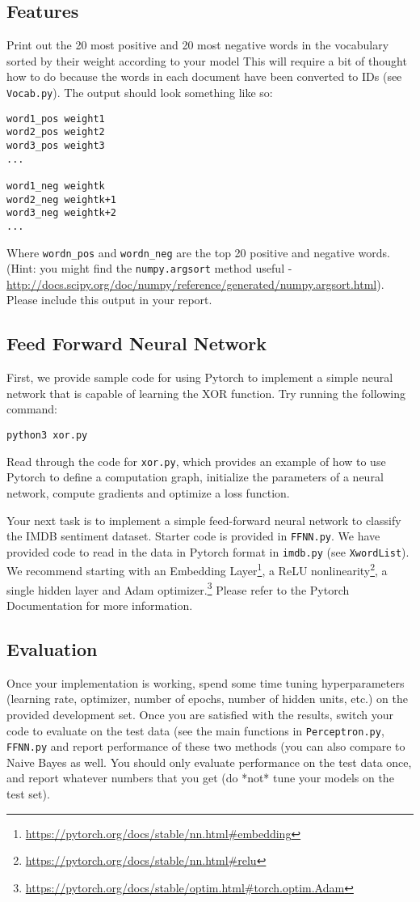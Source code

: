 \documentclass[12pt, letterpaper]{article}
\begin{document}
\subsection*{Features}
Print out the 20 most positive and 20 most negative words in
the vocabulary sorted by their weight according to your model
This will require a bit of thought how to do because the words in each document 
have been converted to IDs (see {\tt Vocab.py}).  The output should look something like so:
\begin{verbatim}
word1_pos weight1
word2_pos weight2
word3_pos weight3
...

word1_neg weightk
word2_neg weightk+1
word3_neg weightk+2
...
\end{verbatim}
Where {\tt wordn\_pos} and {\tt wordn\_neg} are the top 20 positive and negative words.  (Hint: you might find the {\tt numpy.argsort} method
useful - \url{http://docs.scipy.org/doc/numpy/reference/generated/numpy.argsort.html}).  Please include this output in your report.

\subsection*{Feed Forward Neural Network}
First, we provide sample code for using Pytorch to implement a simple neural network that is capable of learning the XOR function.  Try running the following command:
\begin{verbatim}
python3 xor.py
\end{verbatim}
Read through the code for {\tt xor.py}, which provides an example of how to use Pytorch to define a computation graph, initialize the parameters of a neural network, compute gradients and optimize a loss function.

Your next task is to implement a simple feed-forward neural network to classify the IMDB sentiment dataset.  Starter code is provided in {\tt FFNN.py}.  We have provided code to read in the data in Pytorch format in {\tt imdb.py} (see {\tt XwordList}).
We recommend starting with an Embedding Layer\footnote{\url{https://pytorch.org/docs/stable/nn.html\#embedding}}, a ReLU nonlinearity\footnote{\url{https://pytorch.org/docs/stable/nn.html\#relu}}, a single hidden layer and Adam optimizer.\footnote{\url{https://pytorch.org/docs/stable/optim.html\#torch.optim.Adam}}
Please refer to the Pytorch Documentation for more information.

\subsection*{Evaluation}
Once your implementation is working, spend some time tuning hyperparameters (learning rate, optimizer, number of epochs, number of hidden units, etc.) on the provided development set.
Once you are satisfied with the results, switch your code to evaluate on the test data (see the main functions in {\tt Perceptron.py}, {\tt FFNN.py} and report performance of these two methods (you can also compare to Naive Bayes as well.  You should only evaluate performance on the test data once, and report whatever numbers that you get (do *not* tune your models on the test set).
\end{document}
